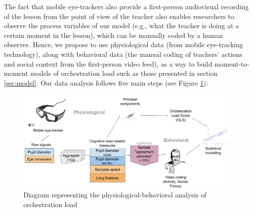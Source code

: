 \documentclass[10pt,journal,compsoc]{IEEEtran}
\begin{document}
The fact that mobile eye-trackers also provide a first-person audiovisual recording of the lesson from the point of view of the teacher also enables researchers to observe the process variables of our model (e.g., what the teacher is doing at a certain moment in the lesson), which can be manually coded by a human observer. Hence, we propose to use physiological data (from mobile eye-tracking technology), along with behavioral data (the manual coding of teachers' actions and social context from the first-person video feed), as a way to build moment-to-moment models of orchestration load such as those presented in section \ref{sec:model}. Our data analysis follows five main steps (see Figure \ref{fig:analysis}):

\begin{figure}[!t]
\centering
\includegraphics[width=\linewidth]{img/AnalysisMethodBase.png}
\caption{Diagram representing the physiological-behavioral analysis of orchestration load}
\label{fig:analysis}
\end{figure}
\end{document}
